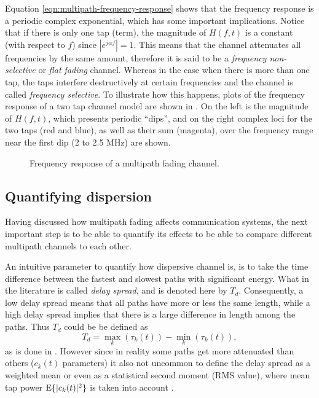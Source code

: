 Equation \eqref{eqn:multipath-frequency-response} shows that the frequency response is a periodic complex exponential, which has some important implications. Notice that if there is only one tap (term), the magnitude of \(H(f, t)\) is a constant (with respect to \(f\)) since \(|e^{j\alpha f}| = 1\). This means that the channel attenuates all frequencies by the same amount, therefore it is said to be a \emph{frequency non-selective} or \emph{flat fading} channel. Whereas in the case when there is more than one tap, the taps interfere destructively at certain frequencies and the channel is called \emph{frequency selective}. To illustrate how this happens, plots of the frequency response of a two tap channel model are shown in . On the left is the magnitude of \(H(f, t)\), which presents periodic ``dips'', and on the right complex loci for the two taps (red and blue), as well as their sum (magenta), over the frequency range near the first dip (2 to 2.5 MHz) are shown.


\begin{figure}
	\centering
	\resizebox{\linewidth}{!}{
		
	}
	\caption{
		Frequency response of a multipath fading channel.
		\label{fig:multipath-frequency-response-plots}
	}
\end{figure}

\subsection{Quantifying dispersion}

Having discussed how multipath fading affects communication systems, the next important step is to be able to quantify its effects to be able to compare different multipath channels to each other.

An intuitive parameter to quantify how dispersive channel is, is to take the time difference between the fastest and slowest paths with significant energy. What in the literature is called \emph{delay spread}, and is denoted here by \(T_d\). Consequently, a low delay spread means that all paths have more or less the same length, while a high delay spread implies that there is a large difference in length among the paths. Thus \(T_d\) could be be defined as
\begin{equation}
	T_d = \max_{k} (\tau_k(t)) -  \min_{k} (\tau_k(t)),
\end{equation}
as is done in \cite{Gallager}. However since in reality some paths get more attenuated than others (\(c_k(t)\) parameters) it also not uncommon to define the delay spread as a weighted mean or even as a statistical second moment (RMS value), where mean tap power \(\operatorname{E}\{|c_k(t)|^2\}\) is taken into account \cite{Mathis,Messier}. %

